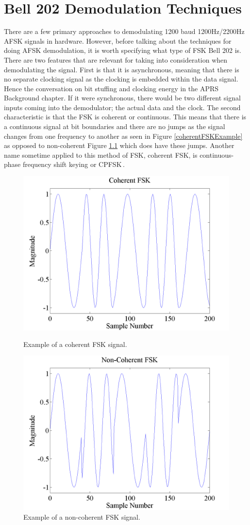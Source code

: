 \chapter{Bell 202 Demodulation Techniques}
There are a few primary approaches to demodulating 1200 baud 1200Hz/2200Hz AFSK signals in hardware.  However, before talking about the techniques for doing AFSK demodulation, it is worth specifying what type of FSK Bell 202 is. There are two features that are relevant for taking into consideration when demodulating the signal. First is that it is asynchronous, meaning that there is no separate clocking signal as the clocking is embedded within the data signal. Hence the conversation on bit stuffing and clocking energy in the APRS Background chapter. If it were synchronous, there would be two different signal inputs coming into the demodulator; the actual data and the clock. The second characteristic is that the FSK is coherent or continuous. This means that there is a continuous signal at bit boundaries and there are no jumps as the signal changes from one frequency to another as seen in Figure \ref{coherentFSKExample} as opposed to non-coherent Figure \ref{noncoherentFSKExample} which does have these jumps. Another name sometime applied to this method of FSK, coherent FSK, is continuous-phase frequency shift keying or CPFSK\,\cite{WikipediaCPFSK}.

\begin{figure}
	\centering
	\includegraphics[width=0.75\linewidth]{images/CoherentFSK.png} 
	\caption{Example of a coherent FSK signal.}
	\label{coherentFSKExample}
	\vspace{15mm}
	\includegraphics[width=0.75\linewidth]{images/NonCoherentFSK.png} 
	\caption{Example of a non-coherent FSK signal.}
	\label{noncoherentFSKExample}
\end{figure}

